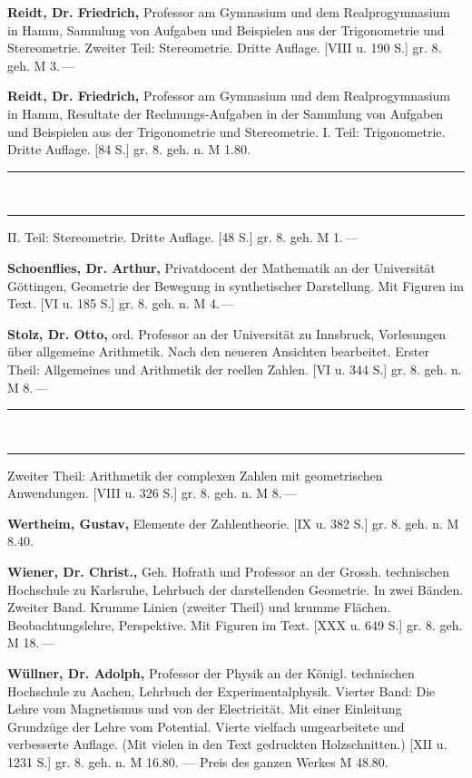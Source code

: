\textbf{Reidt, Dr. Friedrich,} Professor am Gymnasium und dem Realprogymnasium in
Hamm, Sammlung von Aufgaben und Beispielen aus der Trigonometrie und Stereometrie.
Zweiter Teil: Stereometrie. Dritte Auflage. [VIII u. 190 S.] gr. 8. geh. M 3.\,---


\textbf{Reidt, Dr. Friedrich,} Professor am Gymnasium und dem Realprogymnasium in
Hamm, Resultate der Rechnungs-Aufgaben in der Sammlung von Aufgaben und Beispielen
aus der Trigonometrie und Stereometrie. I. Teil: Trigonometrie. Dritte Auflage.
[84 S.] gr. 8. geh. n. M 1.80.

\rule{1.5em}{0.4pt}\ \rule{1.5em}{0.4pt} II. Teil: Stereometrie. Dritte Auflage.
[48 S.] gr. 8. geh. M 1.\,---

\textbf{Schoenflies, Dr. Arthur,} Privatdocent der Mathematik an der Universität
Göttingen, Geometrie der Bewegung in synthetischer Darstellung. Mit Figuren im Text.
[VI u. 185 S.] gr. 8. geh. n. M 4.\,---

\textbf{Stolz, Dr. Otto,} ord. Professor an der Universität zu Innsbruck,
Vorlesungen über allgemeine Arithmetik. Nach den neueren Ansichten bearbeitet.
Erster Theil: Allgemeines und Arithmetik der reellen Zahlen. [VI u. 344 S.] gr. 8.
geh. n. M 8.\,---

\rule{1.5em}{0.4pt}\ \rule{1.5em}{0.4pt} Zweiter Theil: Arithmetik der complexen
Zahlen mit geometrischen Anwendungen. [VIII u. 326 S.] gr. 8. geh. n. M 8.\,---

\textbf{Wertheim, Gustav,} Elemente der Zahlentheorie. [IX u. 382 S.] gr. 8. geh.
n. M 8.40.

\textbf{Wiener, Dr. Christ.,} Geh. Hofrath und Professor an der Grossh. technischen
Hochschule zu Karlsruhe, Lehrbuch der darstellenden Geometrie. In zwei Bänden.
Zweiter Band. Krumme Linien (zweiter Theil) und krumme Flächen. Beobachtungslehre,
Perspektive. Mit Figuren im Text. [XXX u. 649 S.] gr. 8. geh. M 18.\,---

\textbf{Wüllner, Dr. Adolph,} Professor der Physik an der Königl. technischen
Hochschule zu Aachen, Lehrbuch der Experimentalphysik. Vierter Band: Die Lehre vom
Magnetismus und von der Electricität. Mit einer Einleitung \glqq Grundzüge der Lehre
vom Potential\grqq{}. Vierte vielfach umgearbeitete und verbesserte Auflage. (Mit
vielen in den Text gedruckten Holzschnitten.) [XII u. 1231 S.] gr. 8. geh. n.
M 16.80. --- Preis des ganzen Werkes M 48.80.


